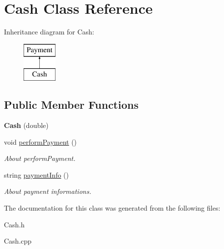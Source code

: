 \hypertarget{classCash}{}\section{Cash Class Reference}
\label{classCash}
Inheritance diagram for Cash\+:\begin{figure}[H]
\begin{center}
\leavevmode
\includegraphics[height=2.000000cm]{classCash}
\end{center}
\end{figure}
\subsection*{Public Member Functions}
\begin{DoxyCompactItemize}
\item 
\mbox{\label{classCash_a60e367204f5992a0a954933039ce0ff5}} 
{\bfseries Cash} (double)
\item 
\mbox{\label{classCash_afcf1108ce8489fb731c0c18613f84183}} 
void \hyperlink{classCash_afcf1108ce8489fb731c0c18613f84183}{perform\+Payment} ()
\begin{DoxyCompactList}\small\item\em About perform\+Payment. \end{DoxyCompactList}\item 
\mbox{\label{classCash_a9d6c758ea4652022a016d5643119c7d2}} 
string \hyperlink{classCash_a9d6c758ea4652022a016d5643119c7d2}{payment\+Info} ()
\begin{DoxyCompactList}\small\item\em About payment informations. \end{DoxyCompactList}\end{DoxyCompactItemize}


The documentation for this class was generated from the following files\+:\begin{DoxyCompactItemize}
\item 
Cash.\+h\item 
Cash.\+cpp\end{DoxyCompactItemize}
